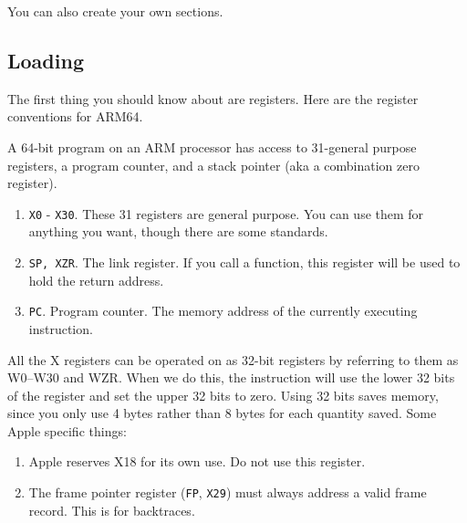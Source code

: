   You can also create your own sections. 

\subsection{Loading}

  The first thing you should know about are registers. Here are the register conventions for ARM64. 

  \begin{definition}
    \label{def:arm64-registers}
    A 64-bit program on an ARM processor has access to 31-general purpose registers, a program counter, and a stack pointer (aka a combination zero register). 
    \begin{enumerate}
      \item \texttt{X0} - \texttt{X30}. These 31 registers are general purpose. You can use them for anything you want, though there are some standards. 
      \item \texttt{SP, XZR}. The link register. If you call a function, this register will be used to hold the return address. 
      \item \texttt{PC}. Program counter. The memory address of the currently executing instruction. 
    \end{enumerate}
    All the X registers can be operated on as 32-bit registers by referring to them as W0–W30 and WZR. When we do this, the instruction will use the lower 32 bits of the register and set the upper 32 bits to zero. Using 32 bits saves memory, since you only use 4 bytes rather than 8 bytes for each quantity saved. 
    Some Apple specific things: 
    \begin{enumerate}
      \item Apple reserves X18 for its own use. Do not use this register. 
      \item The frame pointer register (\texttt{FP}, \texttt{X29}) must always address a valid frame record. This is for backtraces. 
    \end{enumerate}
  \end{definition}

